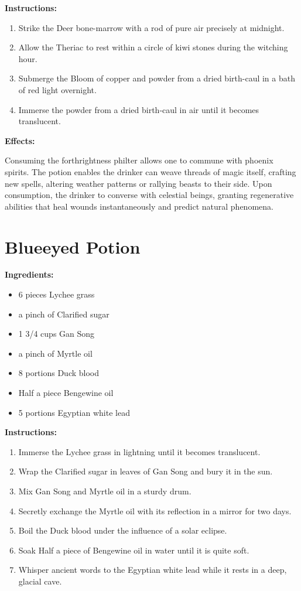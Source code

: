 \documentclass{article}
\begin{document}
\textbf{Instructions:}

\begin{enumerate}
  \item Strike the Deer bone-marrow with a rod of pure air precisely at midnight.
  \item Allow the Theriac to rest within a circle of kiwi stones during the witching hour.
  \item Submerge the Bloom of copper and powder from a dried birth-caul in a bath of red light overnight.
  \item Immerse the powder from a dried birth-caul in air until it becomes translucent.
\end{enumerate}

\textbf{Effects:}

Consuming the forthrightness philter allows one to commune with phoenix spirits. The potion enables the drinker can weave threads of magic itself, crafting new spells, altering weather patterns or rallying beasts to their side. Upon consumption, the drinker to converse with celestial beings, granting regenerative abilities that heal wounds instantaneously and predict natural phenomena.

\newpage
\section*{Blueeyed Potion}

\textbf{Ingredients:}

\begin{itemize}
  \item 6 pieces Lychee grass
  \item a pinch of Clarified sugar
  \item 1 3/4 cups Gan Song
  \item a pinch of Myrtle oil
  \item 8 portions Duck blood
  \item Half a piece Bengewine oil
  \item 5 portions Egyptian white lead
\end{itemize}

\textbf{Instructions:}

\begin{enumerate}
  \item Immerse the Lychee grass in lightning until it becomes translucent.
  \item Wrap the Clarified sugar in leaves of Gan Song and bury it in the sun.
  \item Mix Gan Song and Myrtle oil in a sturdy drum.
  \item Secretly exchange the Myrtle oil with its reflection in a mirror for two days.
  \item Boil the Duck blood under the influence of a solar eclipse.
  \item Soak Half a piece of Bengewine oil in water until it is quite soft.
  \item Whisper ancient words to the Egyptian white lead while it rests in a deep, glacial cave.
\end{enumerate}
\end{document}
